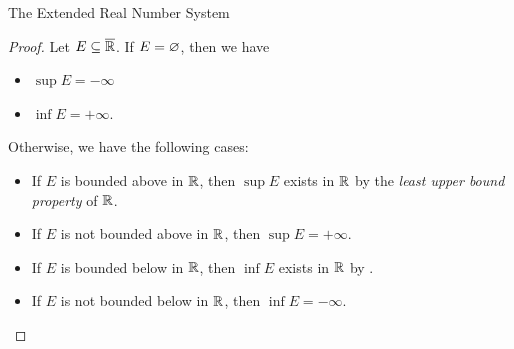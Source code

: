 \begin{section}{The Extended Real Number System}
\begin{proof}
    Let $E \subseteq \overline{\mathbb{R}}$. If $E = \varnothing$, then we have
    \begin{itemize}
        \item $\sup E = - \infty$
        \item $\inf E = + \infty$.
    \end{itemize}
    Otherwise, we have the following cases:
    \begin{itemize}
        \item If $E$ is bounded above in $\mathbb{R}$, then $\sup E$ exists in $\mathbb{R}$ by the
        \emph{least upper bound property} of $\mathbb{R}$.
        \item If $E$ is not bounded above in $\mathbb{R}$, then $\sup E = + \infty$.
        \item If $E$ is bounded below in $\mathbb{R}$, then $\inf E$ exists in $\mathbb{R}$ by .
        \item If $E$ is not bounded below in $\mathbb{R}$, then $\inf E = - \infty$.
    \end{itemize}
\end{proof}

\end{section}